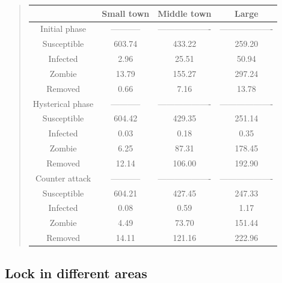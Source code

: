 \documentclass[%
twoside,                 %
final,                   %
10pt]{article}
\begin{document}
\begin{quote}
\begin{tabular}{cccc}
\hline
\multicolumn{1}{c}{  } & \multicolumn{1}{c}{ Small town } & \multicolumn{1}{c}{ Middle town } & \multicolumn{1}{c}{ Large } \\
\hline
Initial phase       & -----------         & ------------------- & ------------------- \\
\hline
Susceptible         & 603.74              & 433.22              & 259.20              \\
Infected            & 2.96                & 25.51               & 50.94               \\
Zombie              & 13.79               & 155.27              & 297.24              \\
Removed             & 0.66                & 7.16                & 13.78               \\
\hline
Hysterical phase    & -----------         & ------------------- & ------------------- \\
\hline
Susceptible         & 604.42              & 429.35              & 251.14              \\
Infected            & 0.03                & 0.18                & 0.35                \\
Zombie              & 6.25                & 87.31               & 178.45              \\
Removed             & 12.14               & 106.00              & 192.90              \\
\hline
Counter attack      & -----------         & ------------------- & ------------------- \\
\hline
Susceptible         & 604.21              & 427.45              & 247.33              \\
Infected            & 0.08                & 0.59                & 1.17                \\
Zombie              & 4.49                & 73.70               & 151.44              \\
Removed             & 14.11               & 121.16              & 222.96              \\
\hline
\end{tabular}
\end{quote}

\noindent
\subsection{Lock in different areas}
\end{document}
